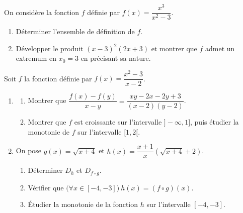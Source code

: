 On considère la fonction $f$ définie par $f(x)=\dfrac{x^3}{x^2-3}$.
\begin{enumerate}
\item Déterminer l'ensemble de définition de $f$.
\item Développer le produit $(x-3)^2(2x+3)$ et montrer que $f$ admet un extremum en $x_0=3$ en précisant sa nature.
\end{enumerate}
\fin
{}
Soit $f$ la fonction définie par $f(x)=\dfrac{x^2-3}{x-2}$.
\begin{enumerate}
\item \begin{enumerate}
\item Montrer que $\dfrac{f(x)-f(y)}{x-y}=\dfrac{xy-2x-2y+3}{(x-2)(y-2)}$.
\item Montrer que $f$ est croissante sur l'intervalle $]-\infty,1]$, puis étudier la monotonie de $f$ sur l'intervalle $[1,2[$.
\end{enumerate}
\item On pose $g(x)=\sqrt{x+4}$ et $h(x)=\dfrac{x+1}{x}\left(\sqrt{x+4}+2\right)$.
\begin{enumerate}
\item Déterminer $D_h$ et $D_{f\circ g}$.
\item Vérifier que $\big(\forall x\in[-4,-3]\big)\ h(x)=(f\circ g)(x)$.
\item Étudier la monotonie de la fonction $h$ sur l'intervalle $[-4,-3]$.
\end{enumerate}
\end{enumerate}
\fin
